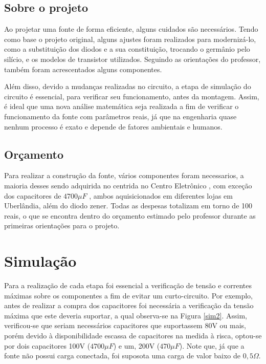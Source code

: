 \documentclass[a4paper,12pt,oneside,openany,table,xcdraw]{article}
\begin{document}
\newpage
\subsection{Sobre o projeto}
 
   Ao projetar uma fonte  de forma  eficiente, alguns cuidados são necessários. Tendo como base o projeto original, alguns ajustes foram realizados para modernizá-lo, como a substituição dos diodos e a sua constituição, trocando o germânio pelo silício, e os modelos de transistor utilizados. Seguindo as orientações do professor, também foram acrescentados alguns componentes.
   
   Além disso, devido a mudanças realizadas no circuito, a etapa de simulação  do circuito é essencial, para verificar seu funcionamento, antes da montagem. Assim, é ideal que uma nova análise matemática seja realizada a fim de verificar o funcionamento da fonte com parâmetros reais, já que na engenharia quase nenhum processo é exato e depende de fatores ambientais e humanos.
 
\subsection{Orçamento}

Para realizar a construção da fonte, vários componentes foram necessarios, a maioria desses sendo adquirida no centrida no Centro Eletrônico , com exceção dos capacitores de $4700 \mu F$ , ambos aquisicionados em diferentes lojas em Uberlândia, além do diodo zener.
Todas as despesas totalizam em torno de 100 reais, o que se encontra dentro do orçamento estimado pelo professor durante as primeiras orientações para o projeto.

\newpage
\section{Simulação}
Para a realização de cada etapa foi essencial a verificação de tensão e correntes máximas sobre os componentes a fim de evitar um curto-circuito.
Por exemplo, antes de realizar a compra dos capacitores foi necessária a verificação da tensão máxima que este deveria suportar, a qual observa-se na Figura \ref{sim2}. Assim, verificou-se que seriam necessários capacitores que suportassem 80V ou mais, porém devido à disponibilidade escassa de capacitores na medida à risca, optou-se por dois capacitores 100V ($4700\mu F$) e um, 200V ($470\mu F$). Note que, já que a fonte não possui carga conectada, foi suposota uma carga de valor baixo de $0,5 \Omega$.
\end{document}
